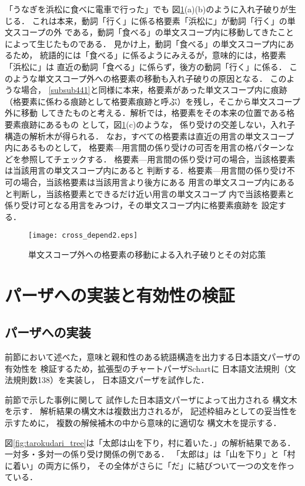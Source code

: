 \documentclass[japanese]{jnlp_1.2}
\begin{document}
「うなぎを浜松に食べに電車で行った」でも
図\ref{fig:cross_depend2}(a)(b)のように入れ子破りが生じる．
これは本来，動詞「行く」に係る格要素「浜松に」が動詞「行く」の単文スコープの外
である，動詞「食べる」の単文スコープ内に移動してきたことによって生じたものである．
見かけ上，動詞「食べる」の単文スコープ内にあるため，
統語的には「食べる」に係るようにみえるが，意味的には，格要素「浜松に」は
直近の動詞「食べる」に係らず，後方の動詞「行く」に係る．
このような単文スコープ外への格要素の移動も入れ子破りの原因となる．
このような場合，
    \ref{subsub441}と同様に本来，格要素があった単文スコープ内に痕跡
（格要素に係わる痕跡として格要素痕跡と呼ぶ）を残し，そこから単文スコープ外に移動
してきたものと考える．解析では，格要素をその本来の位置である格要素痕跡にあるもの
として，図\ref{fig:cross_depend2}(c)のような，
係り受けの交差しない，入れ子構造の解析木が得られる．
なお，すべての格要素は直近の用言の単文スコープ内にあるものとして，
格要素—用言間の係り受けの可否を用言の格パターンなどを参照してチェックする．
格要素—用言間の係り受け可の場合，当該格要素は当該用言の単文スコープ内にあると
判断する．格要素—用言間の係り受け不可の場合，当該格要素は当該用言より後方にある
用言の単文スコープ内にあると判断し，当該格要素とできるだけ近い用言の単文スコープ
内で当該格要素と係り受け可となる用言をみつけ，その単文スコープ内に格要素痕跡を
設定する．

\begin{figure}[t]
  \centering
      \texttt{[image: cross\_depend2.eps]}
  \caption{単文スコープ外への格要素の移動による入れ子破りとその対応策} \label{fig:cross_depend2}
\end{figure}


\section{パーザへの実装と有効性の検証}
\subsection{パーザへの実装}
前節において述べた，意味と親和性のある統語構造を出力する日本語文パーザの有効性を
検証するため，拡張型のチャートパーザSchart\cite{川辺他2005}に
日本語文法規則（文法規則数138）を実装し，
日本語文パーザを試作した．

前節で示した事例に関して
試作した日本語文パーザによって出力される
構文木を示す．
解析結果の構文木は複数出力されるが，
記述枠組みとしての妥当性を示すために，\pagebreak
複数の解候補木の中から意味的に適切な
構文木を提示する．


図\ref{fig:tarokudari_tree}は「太郎は山を下り，村に着いた．」の解析結果である．
一対多・多対一の係り受け関係の例である．
「太郎は」は「山を下り」と「村に着い」の両方に係り，
その全体がさらに「だ」に結びついて一つの文を作っている．
\end{document}
